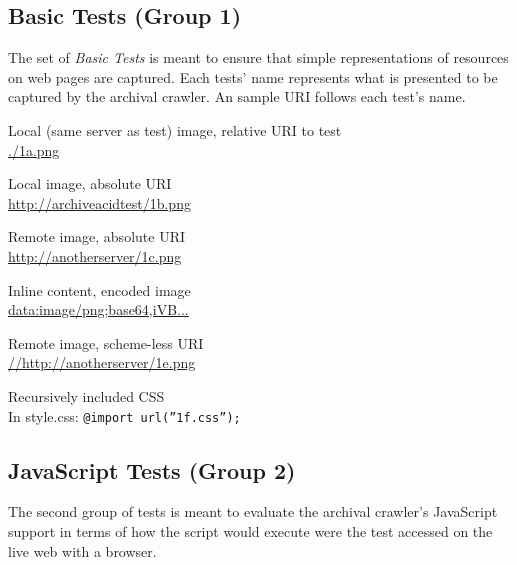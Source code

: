 \documentclass{acm_proc}
\begin{document}
\subsection{Basic Tests (Group 1)}

The set of {\em Basic Tests} is meant to ensure that simple representations of resources on web pages are captured. Each tests' name represents what is presented to be captured by the archival crawler. An sample URI follows each test's name.

\vspace{-1.0em}
\begin{description}\itemsep0pt \parskip0pt 
\item[1a.] Local (same server as test) image, relative URI to test \\ \url{./1a.png}
\item[1b.] Local image, absolute URI \\ \url{http://archiveacidtest/1b.png}
\item[1c.\label{itm:test1c}] Remote image, absolute URI \\ \url{http://anotherserver/1c.png} %
\item[1d.] Inline content, encoded image \\ \url{data:image/png;base64,iVB...}
\item[1e.] Remote image, scheme-less URI \\ \url{//http://anotherserver/1e.png}
\item[1f.] Recursively included CSS\\ In style.css: \texttt{@import url(''1f.css'');}
\end{description}

\subsection{JavaScript Tests (Group 2)}

The second group of tests is meant to evaluate the archival crawler's JavaScript support in terms of how the script would execute were the test accessed on the live web with a browser.
\end{document}
